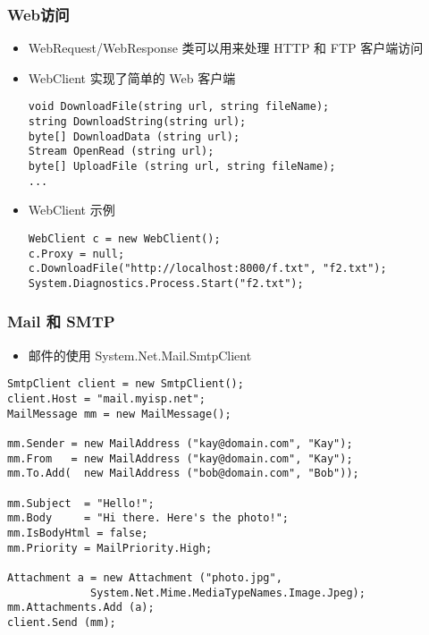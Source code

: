 \begin{frame}[fragile]
\frametitle{Web访问}
\begin{itemize}
\item WebRequest/WebResponse 类可以用来处理 HTTP 和 FTP 客户端访问
\item WebClient 实现了简单的 Web 客户端
\begin{lstlisting}
void DownloadFile(string url, string fileName);
string DownloadString(string url);
byte[] DownloadData (string url);
Stream OpenRead (string url);
byte[] UploadFile (string url, string fileName);
...
\end{lstlisting}
\item WebClient 示例
\begin{lstlisting}
WebClient c = new WebClient();
c.Proxy = null;
c.DownloadFile("http://localhost:8000/f.txt", "f2.txt");
System.Diagnostics.Process.Start("f2.txt");
\end{lstlisting}
\end{itemize}
\end{frame}


\begin{frame}[fragile]
\frametitle{Mail 和 SMTP}

\begin{itemize}
\item 邮件的使用 System.Net.Mail.SmtpClient
\end{itemize}
\begin{lstlisting}
SmtpClient client = new SmtpClient();
client.Host = "mail.myisp.net";
MailMessage mm = new MailMessage();

mm.Sender = new MailAddress ("kay@domain.com", "Kay");
mm.From   = new MailAddress ("kay@domain.com", "Kay");
mm.To.Add(  new MailAddress ("bob@domain.com", "Bob"));

mm.Subject  = "Hello!";
mm.Body     = "Hi there. Here's the photo!";
mm.IsBodyHtml = false;
mm.Priority = MailPriority.High;

Attachment a = new Attachment ("photo.jpg",
             System.Net.Mime.MediaTypeNames.Image.Jpeg);
mm.Attachments.Add (a);
client.Send (mm);
\end{lstlisting}
\end{frame}

